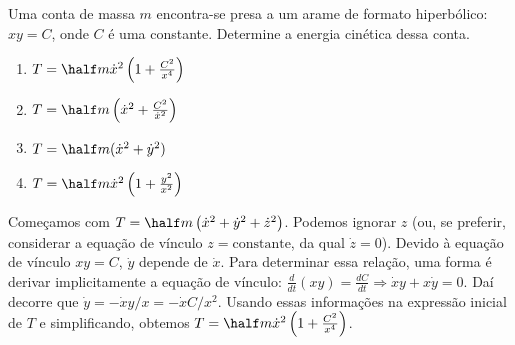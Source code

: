 \begin{question}
    Uma conta de massa $m$ encontra-se presa a um arame de formato hiperbólico: $xy = C$, onde $C$ é uma constante.
    Determine a energia cinética dessa conta.
    \begin{enumerate}
      \item $T = \half m \dot x^2 \left(1 + \frac{C^2}{x^4}\right)$ \rightanswer
      \item $T = \half m \left(\dot x^2 + \frac{C^2}{\dot x^2}\right)$
      \item $T = \half m (\dot x^2 + \dot y^2)$
      \item $T = \half m \dot x^2 \left(1 + \frac{y^2}{x^2}\right)$
    \end{enumerate}

    \begin{solution}
      Começamos com $T = \half m \left(\dot x^2 + \dot y^2 + \dot z^2\right)$.
      Podemos ignorar $z$ (ou, se preferir, considerar a equação de vínculo $z = \text{constante}$, da qual $\dot z = 0$).
      Devido à equação de vínculo $xy = C$, $\dot y$ depende de $\dot x$.
      Para determinar essa relação, uma forma é derivar implicitamente a equação de vínculo: $\frac{d}{dt}(xy) = \frac{dC}{dt} \Rightarrow \dot x y + x \dot y = 0$.
      Daí decorre que $\dot y = -\dot x y/x = -\dot x C/x^2$.
      Usando essas informações na expressão inicial de $T$ e simplificando, obtemos $T = \half m \dot x^2 \left(1 + \frac{C^2}{x^4}\right)$.
    \end{solution}
\end{question}